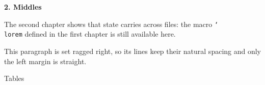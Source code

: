 \centerline{\bf 2. Middles}
\bigskip

The second chapter shows that state carries across files: the macro
{\tt\char`\\lorem} defined in the first chapter is still available here.
\lorem\lorem

{\raggedright This paragraph is set ragged right, so its lines keep their
natural spacing and only the left margin is straight. \lorem\lorem\lorem\par}

\beginsection Tables


\medskip
\lorem\lorem\lorem\lorem\lorem\lorem\lorem

\lorem\lorem\lorem\lorem\lorem\lorem\lorem\lorem

\lorem\lorem\lorem\lorem\lorem\lorem\lorem\lorem
